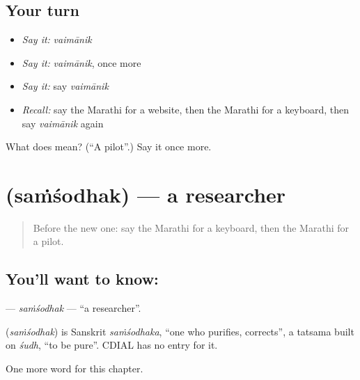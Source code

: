 \subsection*{Your turn}
\begin{itemize}
\raggedright
  \item \emph{Say it:} \emph{vaimānik}
  \item \emph{Say it:} \emph{vaimānik}, once more
  \item \emph{Say it:} say \emph{vaimānik}
  \item \emph{Recall:} say the Marathi for a website, then the Marathi for a keyboard, then say \emph{vaimānik} again
\end{itemize}

\begin{tcolorbox}[breakable,colback=teal!4,colframe=teal!35!black,title={Before you move on}]
What does  mean? (\textquotedblleft{}A pilot\textquotedblright{}.) Say it once more.
\end{tcolorbox}
\section[\texorpdfstring{\mr{संशोधक} (saṁśodhak)}{संशोधक (saṁśodhak)}]{ (saṁśodhak) — a researcher}

\label{lesson:MR-C238-samsodhak}



\begin{quote}
Before the new one: say the Marathi for a keyboard, then the Marathi for a pilot.
\end{quote}

\subsection*{You'll want to know: }
\textbf{} — \emph{saṁśodhak} — \textquotedblleft{}a researcher\textquotedblright{}.

\begin{cousinweb}
\textbf{} (\emph{saṁśodhak}) is Sanskrit \emph{saṁśodhaka}, \textquotedblleft{}one who purifies, corrects\textquotedblright{}, a tatsama built on \emph{śudh}, \textquotedblleft{}to be pure\textquotedblright{}. CDIAL has no entry for it.
\end{cousinweb}

\begin{grammarlens}[title={What you've built}]
One more word for this chapter.
\end{grammarlens}

